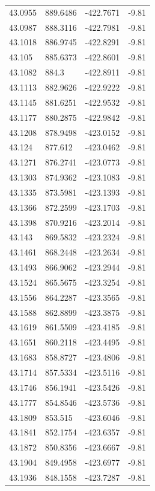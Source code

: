 \begin{table}[H]
\begin{tabular}{llll}
43.0955 & 889.6486 & -422.7671 & -9.81 \\
43.0987 & 888.3116 & -422.7981 & -9.81 \\
43.1018 & 886.9745 & -422.8291 & -9.81 \\
43.105 & 885.6373 & -422.8601 & -9.81 \\
43.1082 & 884.3 & -422.8911 & -9.81 \\
43.1113 & 882.9626 & -422.9222 & -9.81 \\
43.1145 & 881.6251 & -422.9532 & -9.81 \\
43.1177 & 880.2875 & -422.9842 & -9.81 \\
43.1208 & 878.9498 & -423.0152 & -9.81 \\
43.124 & 877.612 & -423.0462 & -9.81 \\
43.1271 & 876.2741 & -423.0773 & -9.81 \\
43.1303 & 874.9362 & -423.1083 & -9.81 \\
43.1335 & 873.5981 & -423.1393 & -9.81 \\
43.1366 & 872.2599 & -423.1703 & -9.81 \\
43.1398 & 870.9216 & -423.2014 & -9.81 \\
43.143 & 869.5832 & -423.2324 & -9.81 \\
43.1461 & 868.2448 & -423.2634 & -9.81 \\
43.1493 & 866.9062 & -423.2944 & -9.81 \\
43.1524 & 865.5675 & -423.3254 & -9.81 \\
43.1556 & 864.2287 & -423.3565 & -9.81 \\
43.1588 & 862.8899 & -423.3875 & -9.81 \\
43.1619 & 861.5509 & -423.4185 & -9.81 \\
43.1651 & 860.2118 & -423.4495 & -9.81 \\
43.1683 & 858.8727 & -423.4806 & -9.81 \\
43.1714 & 857.5334 & -423.5116 & -9.81 \\
43.1746 & 856.1941 & -423.5426 & -9.81 \\
43.1777 & 854.8546 & -423.5736 & -9.81 \\
43.1809 & 853.515 & -423.6046 & -9.81 \\
43.1841 & 852.1754 & -423.6357 & -9.81 \\
43.1872 & 850.8356 & -423.6667 & -9.81 \\
43.1904 & 849.4958 & -423.6977 & -9.81 \\
43.1936 & 848.1558 & -423.7287 & -9.81 \\

\end{tabular}
\end{table}
